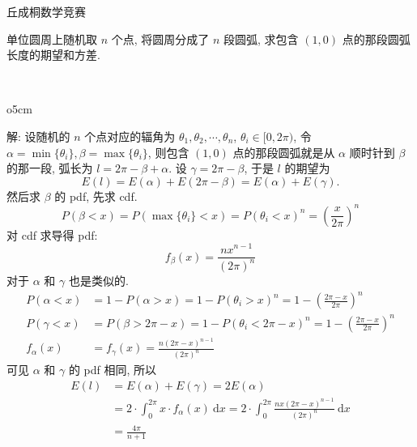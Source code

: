  丘成桐数学竞赛

单位圆周上随机取 $n$ 个点, 将圆周分成了 $n$ 段圆弧, 求包含 $(1,0)$ 点的那段圆弧长度的期望和方差.

~

\begin{wrapfigure}{o}{5cm}
\end{wrapfigure}
解: 设随机的 $n$ 个点对应的辐角为 $\theta_1, \theta_2, \cdots, \theta_n$, $\theta_i\in[0,2\pi)$, 令 $\alpha = \min\{\theta_i\}, \beta = \max\{\theta_i\}$, 则包含 $(1,0)$ 点的那段圆弧就是从 $\alpha$ 顺时针到 $\beta$ 的那一段, 弧长为 $l = 2\pi - \beta + \alpha$. 设 $\gamma = 2\pi - \beta$, 
于是 $l$ 的期望为 
\[E(l) = E(\alpha) + E(2\pi - \beta) = E(\alpha) + E(\gamma).\]
然后求 $\beta$ 的 pdf, 先求 cdf. 
\[
P(\beta < x) = P(\max\{\theta_i\} < x) = P(\theta_i < x)^n = \left(\frac{x}{2\pi}\right)^n 
\]
对 cdf 求导得 pdf:
\[ f_\beta(x) = \frac{nx^{n-1}}{(2\pi)^n} \]
对于 $\alpha$ 和 $\gamma$ 也是类似的.
\begin{align*}
P(\alpha < x) &= 1 - P(\alpha > x) = 1 - P(\theta_i > x)^n = 1 - \left(\frac{2\pi - x}{2\pi}\right)^n \\
P(\gamma < x) &= P(\beta > 2\pi - x) = 1 - P(\theta_i < 2\pi - x)^n = 1 - \left(\frac{2\pi - x}{2\pi}\right)^n \\
f_\alpha(x) &= f_\gamma(x) = \frac{n(2\pi-x)^{n-1}}{(2\pi)^n}
\end{align*}
可见 $\alpha$ 和 $\gamma$ 的 pdf 相同, 所以
\begin{align*}
E(l) &= E(\alpha) + E(\gamma) = 2E(\alpha) \\
&=2\cdot \int_0^{2\pi} x\cdot f_\alpha(x)\ \mathrm{d}x = 2\cdot \int_0^{2\pi} \frac{nx(2\pi - x)^{n-1}}{(2\pi)^n}\ \mathrm{d}x \\
&= \frac{4\pi}{n+1}
\end{align*}

